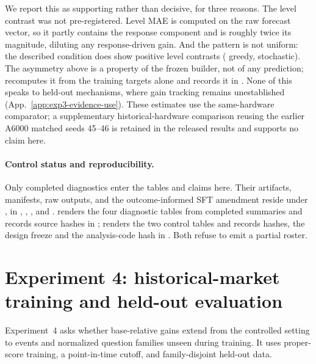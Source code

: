 We report this as supporting rather than decisive, for three reasons. The
level contrast was not pre-registered. Level MAE is computed on the raw
forecast vector, so it partly contains the response component and is roughly
twice its magnitude, diluting any response-driven gain. And the pattern is not
uniform: the described condition does show positive level contrasts
(\eShufDiscGreedyLevelEst{} greedy, \eShufDiscStochLevelEst{} stochastic). The
asymmetry above is a property of the frozen builder, not of any prediction;
 recomputes it from the training targets
alone and records it in . None of this speaks
to held-out mechanisms, where gain tracking remains unestablished
(App.~\ref{app:exp3-evidence-use}). These estimates use the same-hardware
comparator; a supplementary historical-hardware comparison reusing the earlier
A6000 matched seeds 45--46 is retained in the released results and supports no
claim here.

\paragraph{Control status and reproducibility.}
Only completed diagnostics enter the tables and claims here. Their artifacts,
manifests, raw
outputs, and the outcome-informed SFT amendment reside under
, in
, , , and
.
 renders the four diagnostic
tables from completed summaries and records source hashes in
;
 renders the two control
tables and records hashes, the design freeze and the analysis-code hash in
. Both refuse to emit a
partial roster.

\section{Experiment 4: historical-market training and held-out evaluation}
\label{app:exp4}
\label{app:exp3b-protocol}

Experiment~4 asks whether base-relative gains extend from the controlled setting
to events and normalized question families unseen during training. It uses
proper-score training, a point-in-time cutoff, and family-disjoint held-out data.

